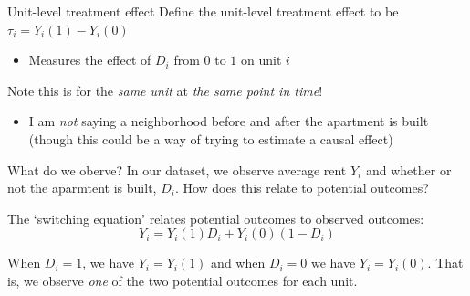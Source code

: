 \documentclass[aspectratio=169,t,11pt,table]{beamer}
\begin{document}
\begin{frame}{Unit-level treatment effect}
  Define the \alert{unit-level treatment effect} to be $\tau_i = Y_i(1) - Y_i(0)$
  \begin{itemize}
    \item Measures the effect of $D_i$ from $0$ to $1$ on unit $i$
  \end{itemize}

  \bigskip
  Note this is for the \emph{same unit} at \emph{the same point in time}!
  
  \pause
  \begin{itemize}
    \item I am \emph{not} saying a neighborhood before and after the apartment is built (though this could be a way of trying to estimate a causal effect)
  \end{itemize}
\end{frame}

\begin{frame}{What do we oberve?}
  In our dataset, we observe average rent $Y_i$ and whether or not the aparmtent is built, $D_i$. How does this relate to potential outcomes?
  
  \bigskip
  The \alert{`switching equation'} relates potential outcomes to observed outcomes:
  $$
    Y_i = Y_i(1) D_i + Y_i(0) (1 - D_i)
  $$

  \pause
  \bigskip
  When $D_i = 1$, we have $Y_i = Y_i(1)$ and when $D_i = 0$ we have $Y_i = Y_i(0)$. That is, we observe \emph{one} of the two potential outcomes for each unit.
\end{frame}
\end{document}
